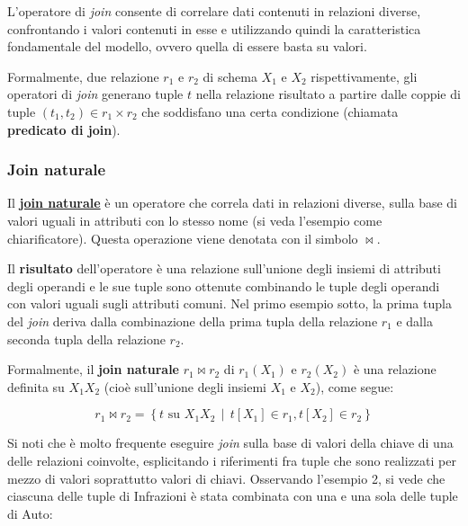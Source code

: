 \documentclass[a4paper]{article}
\begin{document}
	L'operatore di \emph{join} consente di correlare dati contenuti in relazioni diverse, confrontando i valori contenuti in esse e utilizzando quindi la caratteristica fondamentale del modello, ovvero quella di essere basta su valori.
	
	Formalmente, due relazione $r_{1}$ e $r_{2}$ di schema $X_{1}$ e $X_{2}$ rispettivamente, gli operatori di \emph{join} generano tuple $t$ nella relazione risultato a partire dalle coppie di tuple $\left(t_{1}, t_{2}\right) \in r_{1} \times r_{2}$ che soddisfano una certa condizione (chiamata \textbf{predicato di join}).
	
	\subsubsection{Join naturale}
	
	Il \textcolor{Red3}{\textbf{\underline{join naturale}}} è un operatore che correla dati in relazioni diverse, sulla base di valori uguali in attributi con lo stesso nome (si veda l'esempio come chiarificatore). Questa operazione viene denotata con il simbolo $\Join$.
	
	Il \textbf{risultato} dell'operatore è una relazione sull'unione degli insiemi di attributi degli operandi e le sue tuple sono ottenute combinando le tuple degli operandi con valori uguali sugli attributi comuni. Nel primo esempio sotto, la prima tupla del \emph{join} deriva dalla combinazione della prima tupla della relazione $r_{1}$ e dalla seconda tupla della relazione $r_{2}$.\newline
	
	\noindent
	Formalmente, il \textbf{join naturale} $r_{1} \Join r_{2}$ di $r_{1}\left(X_{1}\right)$ e $r_{2}\left(X_{2}\right)$ è una relazione definita su $X_{1}X_{2}$ (cioè sull'unione degli insiemi $X_{1}$ e $X_{2}$), come segue:
	
	\begin{equation*}
		r_{1} \Join r_{2} = \left\{t \text{ su } X_{1}X_{2} \:\: | \:\: t\left[X_{1}\right] \in r_{1}, t\left[X_{2}\right] \in r_{2}\right\}
	\end{equation*}

	\noindent
	Si noti che è molto frequente eseguire \emph{join} sulla base di valori della chiave di una delle relazioni coinvolte, esplicitando i riferimenti fra tuple che sono realizzati per mezzo di valori soprattutto valori di chiavi. Osservando l'esempio 2, si vede che ciascuna delle tuple di \textsf{Infrazioni} è stata combinata con una e una sola delle tuple di \textsf{Auto}:
	
\end{document}
